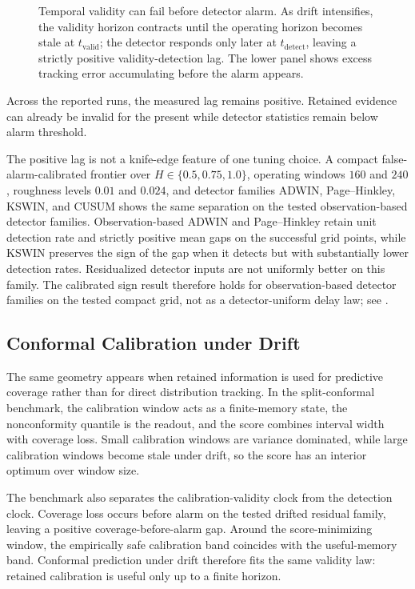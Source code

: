 \begin{figure}[!htbp]
\centering
{}
\caption{Temporal validity can fail before detector alarm. As drift intensifies,
the validity horizon contracts until the operating horizon becomes
stale at $t_{\mathrm{valid}}$; the detector responds only later at
$t_{\mathrm{detect}}$, leaving a strictly positive validity-detection lag. The
lower panel shows excess tracking error accumulating before the alarm appears.}
\label{fig:validity_lag}
\end{figure}

Across the reported runs, the measured lag remains positive. Retained evidence
can already be invalid for the present while detector statistics remain below
alarm threshold.

The positive lag is not a knife-edge feature of one tuning choice. A compact
false-alarm-calibrated frontier over $H\in\{0.5,0.75,1.0\}$, operating windows
$160$ and $240$, roughness levels $0.01$ and $0.024$, and detector families
ADWIN, Page--Hinkley, KSWIN, and CUSUM shows the same separation on the tested
observation-based detector families. Observation-based ADWIN and Page--Hinkley
retain unit detection rate and strictly positive mean gaps on the successful
grid points, while KSWIN preserves the sign of the gap when it detects but with
substantially lower detection rates. Residualized detector inputs are not
uniformly better on this family. The calibrated sign result therefore holds for
observation-based detector families on the tested compact grid, not as a
detector-uniform delay law; see .

\subsection{Conformal Calibration under Drift}
\label{sec:empirical_conformal}

The same geometry appears when retained information is used for predictive
coverage rather than for direct distribution tracking. In the split-conformal
benchmark, the calibration window acts as a finite-memory state, the
nonconformity quantile is the readout, and the score combines interval width
with coverage loss. Small calibration windows are variance dominated, while
large calibration windows become stale under drift, so the score has an interior
optimum over window size.

The benchmark also separates the calibration-validity clock from the detection
clock. Coverage loss occurs before alarm on the tested drifted residual family,
leaving a positive coverage-before-alarm gap. Around the score-minimizing
window, the empirically safe calibration band coincides with the useful-memory
band. Conformal prediction under drift therefore fits the same validity law:
retained calibration is useful only up to a finite horizon.

